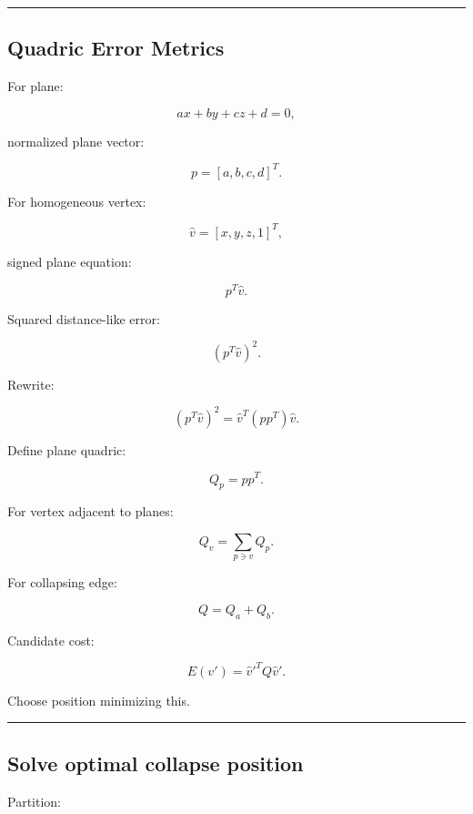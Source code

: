 \begin{center}\rule{0.5\linewidth}{0.5pt}\end{center}

\subsection{Quadric Error Metrics}\label{04-visual-computing-ii-ch041-quadric-error-metrics}

\hypertarget{04-visual-computing-ii-ch041-quadric-error-metrics}{}

For plane:

\[
ax+by+cz+d=0,
\]

normalized plane vector:

\[
p=
[a,b,c,d]^T.
\]

For homogeneous vertex:

\[
\hat v=
[x,y,z,1]^T,
\]

signed plane equation:

\[
p^T\hat v.
\]

Squared distance-like error:

\[
(p^T\hat v)^2.
\]

Rewrite:

\[
\boxed{
(p^T\hat v)^2
=
\hat v^T
(pp^T)
\hat v.
}
\]

Define plane quadric:

\[
Q_p=pp^T.
\]

For vertex adjacent to planes:

\[
\boxed{
Q_v=
\sum_{p\ni v}
Q_p.
}
\]

For collapsing edge:

\[
Q=
Q_a+Q_b.
\]

Candidate cost:

\[
\boxed{
E(v')
=
\hat v'^TQ\hat v'.
}
\]

Choose position minimizing this.

\begin{center}\rule{0.5\linewidth}{0.5pt}\end{center}

\subsection{Solve optimal collapse position}\label{04-visual-computing-ii-ch041-solve-optimal-collapse-position}

\hypertarget{04-visual-computing-ii-ch041-solve-optimal-collapse-position}{}

Partition:

